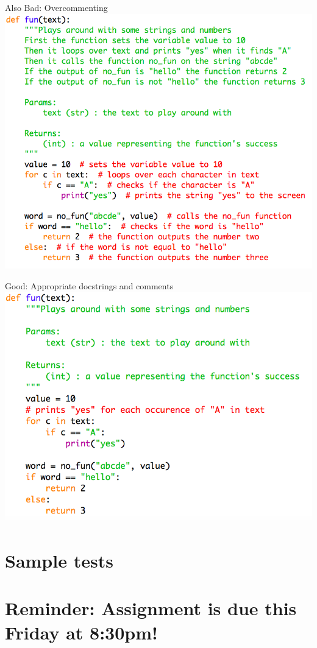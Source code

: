 \documentclass[week2]{csse1001}
\begin{document}
\begin{topic}{Also Bad: Overcommenting}
\includegraphics[height=0.9\textheight]{bad_python/bad_comments}
\end{topic}

\begin{topic}{Good: Appropriate docstrings and comments}
\includegraphics[height=0.9\textheight]{bad_python/good_comments}
\end{topic}

\section{Sample tests}



\section{Reminder: Assignment is due this Friday at 8:30pm!}
\end{document}
